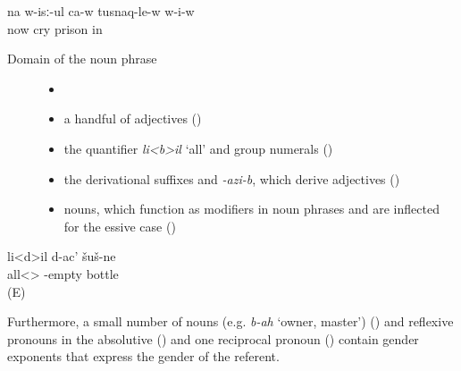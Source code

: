 \begin{exe}
	\ex	\label{ex:‎Now he is crying in prisonAGREE}
	\gll	na	w-isː-ul	ca-w	tusnaq-le-w	w-i-w\\
		now	cry		prison	in\\
	\glt	{}
\end{exe}


\begin{description}
\item[Domain of the noun phrase]
\begin{itemize}[leftmargin=*]
    \item[]
    \item	a handful of adjectives ()
	\item	the quantifier \textit{li<b>il} ‘all' and group numerals ()
	\item	the derivational suffixes  and \textit{-azi-b}, which derive adjectives ()
	\item	nouns, which function as modifiers in noun phrases and are inflected for the essive case ()
\end{itemize}
\end{description}


\begin{exe}
	\ex	\label{ex:All empty bottlesAGREE}
	\gll	li<d>il d-ac' šuš-ne\\
		all<> 	-empty	bottle\\
	\glt	{} (E)
\end{exe}



Furthermore, a small number of nouns (e.g. \textit{b-ah} ‘owner, master') () and reflexive pronouns in the absolutive () and one reciprocal pronoun () contain gender exponents that express the gender of the referent.

